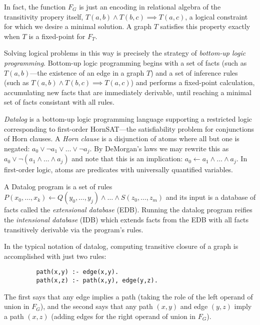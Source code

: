 In fact, the function $F_G$ is just an encoding in relational algebra of the transitivity propery itself, $T(a,b) \wedge T(b,c) \implies T(a,c)$, a logical constraint for which we desire a minimal solution. A graph $T$ satisfies this property exactly when $T$ is a fixed-point for $F_T$.

Solving logical problems in this way is precisely the strategy of \emph{bottom-up logic programming}. Bottom-up logic programming begins with a set of facts (such as $T(a,b)$---the existence of an edge in a graph $T$) and a set of inference rules (such as $T(a,b) \wedge T(b,c) \implies T(a,c)$) and performs a fixed-point calculation, accumulating new facts that are immediately derivable, until reaching a minimal set of facts consistant with all rules.

\emph{Datalog} is a bottom-up logic programming language supporting a restricted logic corresponding to first-order HornSAT---the satisfiability problem for conjunctions of Horn clauses. A \emph{Horn clause} is a disjunction of atoms where all but one is negated: $a_0 \vee \neg a_1 \vee \ldots \vee \neg a_j$. By DeMorgan's laws we may rewrite this as $a_0 \vee \neg (a_1 \wedge \ldots \wedge a_j)$ and note that this is an implication: $a_0 \leftarrow a_1 \wedge \ldots \wedge a_j$. In first-order logic, atoms are predicates with universally quantified variables.

A Datalog program is a set of rules $P(x_0,\ldots,x_k) \leftarrow Q(y_0,\ldots,y_j) \wedge \ldots \wedge S(z_0,\ldots,z_m)$ and its input is a database of facts called the \emph{extensional database} (EDB). Running the datalog program reifies the \emph{intensional database} (IDB) which extends facts from the EDB with all facts transitively derivable via the program's rules.

In the typical notation of datalog, computing transitive closure of a graph is accomplished with just two rules:

\begin{verbatim}
         path(x,y) :- edge(x,y).
         path(x,z) :- path(x,y), edge(y,z).
\end{verbatim}

The first says that any edge implies a path (taking the role of the left operand of union in $F_G$), and the second says that any path $(x,y)$ and edge $(y,z)$ imply a path $(x,z)$ (adding edges for the right operand of union in $F_G$).

